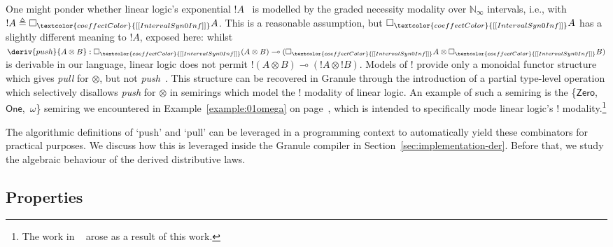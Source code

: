 \begin{remark}
One might ponder whether linear logic's exponential $!
A$~\citep{girard1987linear} is modelled by the graded necessity modality over
$\mathbb{N}_{\infty}$ intervals, i.e., with $! A \triangleq
\Box_{\textcolor{coeffectColor}{[[ IntervalSyn 0 Inf ]] }} A$. This is a
reasonable assumption, but $\Box_{\textcolor{coeffectColor}{[[ IntervalSyn 0 Inf
]] }} A$ has a slightly different meaning to $! A$, exposed here: whilst
$\deriv{push}{A \otimes B} : \Box_{\textcolor{coeffectColor}{[[ IntervalSyn 0
Inf ]]}} (A \otimes B) \multimap (\Box_{\textcolor{coeffectColor}{[[ IntervalSyn
0 Inf ]] }} A \otimes \Box_{\textcolor{coeffectColor}{[[ IntervalSyn 0 Inf ]]}}
B)$ is derivable in our language, linear logic does not permit $!(A \otimes B)
\multimap (!A \otimes !B)$. Models of $!$ provide only a monoidal functor
structure which gives \emph{pull} for $\otimes$, but not
\emph{push}~\citep{benton1992linear}. This structure can be recovered in Granule
through the introduction of a partial type-level operation which selectively
disallows \emph{push} for $\otimes$ in semirings which model the $!$ modality of
linear logic. An example of such a semiring is the \{$\mathsf{Zero}$,\
$\mathsf{One}$,\ $\omega$\} semiring we encountered in
Example~\ref{example:01omega} on page~\pageref{example:01omega}, which is
intended to specifically mode linear logic's $!$ modality.\footnote{The work in
~\citet{hughes:lirmm-03271465} arose as a result of this work.}
\end{remark}

The algorithmic definitions of `push' and `pull' can be leveraged
in a programming context to automatically yield these combinators for
practical purposes. We discuss how this is leveraged inside the
Granule compiler in Section~\ref{sec:implementation-der}.
Before that, we study the algebraic behaviour of the derived distributive laws.

\subsection{Properties}
\label{subsection:properties}



